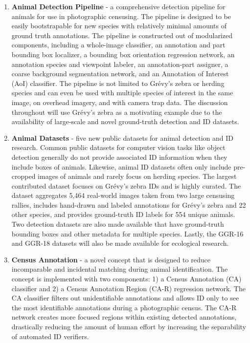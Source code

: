 \begin{enumerate}
    \item \textbf{Animal Detection Pipeline} - a comprehensive detection pipeline for animals for use in photographic censusing.  The pipeline is designed to be easily bootstrapable for new species with relatively minimal amounts of ground truth annotations.  The pipeline is constructed out of modularized components, including a whole-image classifier, an annotation and part bounding box localizer, a bounding box orientation regression network, an annotation species and viewpoint labeler, an annotation-part assigner, a coarse background segmentation network, and an Annotation of Interest (AoI) classifier.  The pipeline is not limited to Gr\'evy's zebra or herding species and can even be used with multiple species of interest in the same image, on overhead imagery, and with camera trap data.  The discussion throughout will use Gr\'evy's zebra as a motivating example due to the availability of large-scale and novel ground-truth detection and ID datasets.
    \item \textbf{Animal Datasets} - five new public datasets for animal detection and ID research.  Common public datasets for computer vision tasks like object detection generally do not provide associated ID information when they include boxes of animals.  Likewise, animal ID datasets often only include pre-cropped images of animals and rarely focus on herding species.  The largest contributed dataset focuses on Gr\'evy's zebra IDs and is highly curated.  The dataset aggregates 5,464 real-world images taken from two large censusing rallies, includes hand-drawn and labeled annotations for Gr\'evy's zebra and 22 other species, and provides ground-truth ID labels for 554 unique animals.  Two detection datasets are also made available that have ground-truth bounding boxes and other metadata for multiple species.  Lastly, the GGR-16 and GGR-18 datasets will also be made available for ecological research.
    \item \textbf{Census Annotation} - a novel concept that is designed to reduce incomparable and incidental matching during animal identification.  The concept is implemented with two components: 1) a Census Annotation (CA) classifier and 2) a Census Annotation Region (CA-R) regression network.  The CA classifier filters out unidentifiable annotations and allows ID only to see the most identifiable annotations during a photographic census.  The CA-R network creates more focused regions within existing detected annotations, drastically reducing the amount of human effort by increasing the separability of automated ID verifiers.

\end{enumerate}
